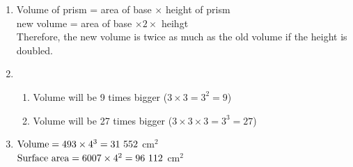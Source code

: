  \begin{solutions}{}{
\begin{enumerate}[itemsep=5pt, label=\textbf{\arabic*}. ] 
\item Volume of prism = area of base $\times$ height of prism \\
new volume = area of base $\times 2 \times$ heihgt \\
Therefore, the new volume is twice as much as the old volume if the height is doubled. 
\item \begin{enumerate}[itemsep=5pt, label=\textbf{\alph*}.]
       \item Volume will be 9 times bigger ($3 \times 3 = 3^{2} = 9$)
\item Volume will be 27 times bigger ($3 \times 3 \times 3 = 3^{3} = 27$)
      \end{enumerate}
\item $\mbox{Volume} = 493 \times 4^{3} \\
= 31~552 ~$cm$^{2}$ \\
$\mbox{Surface area} = 6007 \times 4^{2} \\
= 96~112 ~$cm$^{2}$
\end{enumerate}}
\end{solutions}


